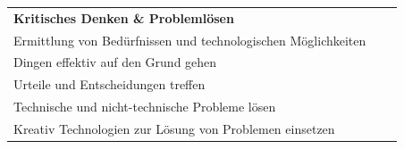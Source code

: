 \documentclass[
  ngerman,
  paper=a4,
,captions=tableheading
]{scrartcl}
\begin{document}
\begin{longtable}[]{@{}lll@{}}
\begin{minipage}[t]{0.72\columnwidth}
\textbf{Kritisches Denken \& Problemlösen}\strut
\end{minipage} & \begin{minipage}[t]{0.10\columnwidth}\raggedright
\strut
\end{minipage} & \begin{minipage}[t]{0.10\columnwidth}\raggedright
\strut
\end{minipage}\tabularnewline
\begin{minipage}[t]{0.72\columnwidth}\raggedright
Ermittlung von Bedürfnissen und technologischen Möglichkeiten\strut
\end{minipage} & \begin{minipage}[t]{0.10\columnwidth}\raggedright
\strut
\end{minipage} & \begin{minipage}[t]{0.10\columnwidth}\raggedright
\strut
\end{minipage}\tabularnewline
\begin{minipage}[t]{0.72\columnwidth}\raggedright
Dingen effektiv auf den Grund gehen\strut
\end{minipage} & \begin{minipage}[t]{0.10\columnwidth}\raggedright
\strut
\end{minipage} & \begin{minipage}[t]{0.10\columnwidth}\raggedright
\strut
\end{minipage}\tabularnewline
\begin{minipage}[t]{0.72\columnwidth}\raggedright
Urteile und Entscheidungen treffen\strut
\end{minipage} & \begin{minipage}[t]{0.10\columnwidth}\raggedright
\strut
\end{minipage} & \begin{minipage}[t]{0.10\columnwidth}\raggedright
\strut
\end{minipage}\tabularnewline
\begin{minipage}[t]{0.72\columnwidth}\raggedright
Technische und nicht-technische Probleme lösen\strut
\end{minipage} & \begin{minipage}[t]{0.10\columnwidth}\raggedright
\strut
\end{minipage} & \begin{minipage}[t]{0.10\columnwidth}\raggedright
\strut
\end{minipage}\tabularnewline
\begin{minipage}[t]{0.72\columnwidth}\raggedright
Kreativ Technologien zur Lösung von Problemen einsetzen\strut

\end{minipage}
\end{longtable}
\end{document}
